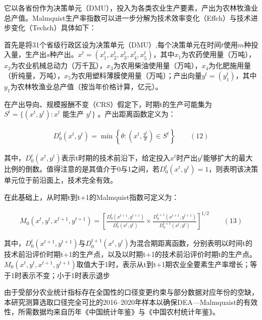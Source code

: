 \documentclass[UTF8,a4paper,12pt,fontset=windows]{ctexart}
\begin{document}
它以各省份作为决策单元（DMU），投入为各类农业生产要素，产出为农林牧渔业总产值。Malmquist生产率指数可以进一步分解为技术效率变化（Effch）与技术进步变化（Techch）具体如下：

首先是将31个省级行政区设为决策单元（DMU）,每个决策单元在时间\(t\)使用\(m\)种投入量，生产出\(s\)种产出。\(x^{t} = \left( x_{1}^{t},x_{2}^{t},x_{3}^{t},x_{4}^{t},x_{5}^{t} \right)\)，其中\(x_{1}\)为农药使用量（万吨），\(x_{2}\)为农业机械总动力（万千瓦），\(x_{3}\)为农用柴油使用量（万吨），\(x_{4}\)为化肥施用量（折纯量，万吨），\(x_{5}\)为农用塑料薄膜使用量（万吨）；产出向量\(y^{t} = \left( y_{1}^{t} \right)\)，其中\(y_{1}\)为农林牧渔业总产值（按当年价格计算，亿元）。

在产出导向、规模报酬不变（CRS）假定下，时期t的生产可能集为\(S^{t} = \text{\{}\left( x^{t},y^{t} \right):x^{t}\text{ 能生产 }y^{t}\text{\}}\) 。产出距离函数定义为：

\[\begin{array}{r}
D_{0}^{t}\left( x^{t},y^{t} \right) = \min\left\{ \theta:\left( x^{t},\frac{y^{t}}{\theta} \right) \in S^{t} \right\}\qquad(12)
\end{array}\]

其中，\(D_{0}^{t}\left( x^{t},y^{t} \right)\)表示t时期的技术前沿下，给定投入\(x^{t}\)时产出\(y^{t}\)能够扩大的最大比例的倒数。值得注意的是其值介于0与1之间，若\(D_{0}^{t}\left( x^{t},y^{t} \right) = 1\)，则表明该决策单元位于前沿面上，技术完全有效。

在此基础上，从时期t到t+1的Malmquist指数可定义为：

\[\begin{array}{r}
M_{0}\left( x^{t},y^{t},x^{t + 1},y^{t + 1} \right) = \left\lbrack \frac{D_{0}^{t}\left( x^{t + 1},y^{t + 1} \right)}{D_{0}^{t}\left( x^{t},y^{t} \right)} \times \frac{D_{0}^{t + 1}\left( x^{t + 1},y^{t + 1} \right)}{D_{0}^{t + 1}\left( x^{t},y^{t} \right)} \right\rbrack^{1\text{/}2}\qquad(13)
\end{array}\]

其中，\(D_{0}^{t}\left( x^{t + 1},y^{t + 1} \right)\)与\(D_{0}^{t + 1}\left( x^{t},y^{t} \right)\)为混合期距离函数，分别表明以时间t的技术前沿评价时期t+1的生产点，以及以时期t+1的技术前沿评价时期t的生产点。\(M_{0}\left( x^{t},y^{t},x^{t + 1},y^{t + 1} \right)\)取值大于1时，表示从t到t+1期农业全要素生产率增长；等于1时表示不变；小于1时表示退步

由于受部分农业统计指标存在全国性的口径变更约束与部分数据对应年份的空缺，本研究测算选取口径完全可比的2016--2020年样本以确保DEA---Malmquaist的有效性，所需数据均来自历年《中国统计年鉴》与《中国农村统计年鉴》。
\end{document}
